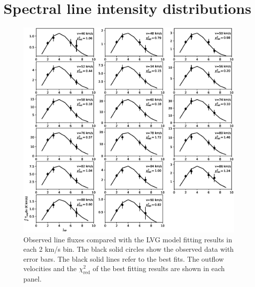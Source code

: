 \documentclass[twocolumn]{aastex62}
\begin{document}
\appendix
\section{Spectral line intensity distributions}
\begin{figure}[htbp]
\includegraphics[scale=.60]{./fig/SED.eps}
\caption{Observed line fluxes compared with the LVG model fitting results in each 2 km/s bin. The black solid circles show the observed data with error bars. The black solid lines refer to the best fits. The outflow velocities and the $\chi^2_{\mathrm{red}}$ of the best fitting results are shown in each panel. \label{fig:figsed}}
\end{figure}
\end{document}
